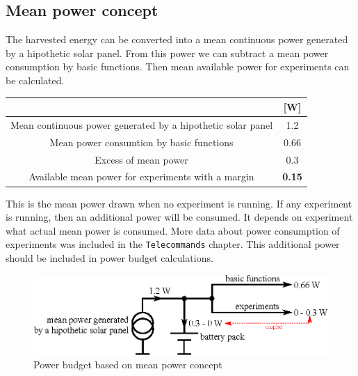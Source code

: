 \subsection{Mean power concept}
The harvested energy can be converted into a mean continuous power generated by a hipothetic solar panel. From this power we can subtract a mean power consumption by basic functions. Then mean available power for experiments can be calculated.

\begin{center}
	\begin{tabular}{c|c}
		&[W] \\ \hline
		Mean continuous power generated by a hipothetic solar panel & 1.2 \\ \hline
		Mean power consumtion by basic functions & 0.66 \\ \hline
		Excess of mean power & 0.3 \\ \hline
		Available mean power for experiments with a margin & \textbf{0.15}
	\end{tabular}
\end{center}

This is the mean power drawn when no experiment is running. If any experiment is running, then an additional power will be consumed. It depends on experiment what actual mean power is consumed. More data about power consumption of experiments was included in the \texttt{Telecommands} chapter. This additional power should be included in power budget calculations.

\begin{figure}[ht]
	\begin{center}
		\includegraphics{img/power-budget-power}
		\caption{Power budget based on mean power concept}
		\label{fig:pwr:power}
	\end{center}
\end{figure}

